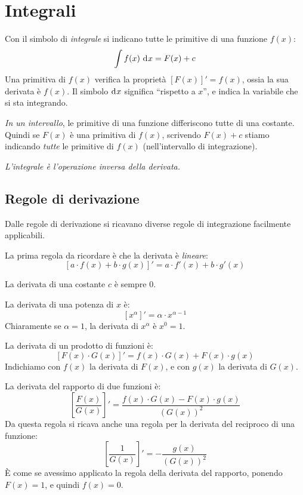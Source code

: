 
\renewcommand*\rmdefault{ppl}



\chapter{Integrali}

Con il simbolo di \emph{integrale} si indicano tutte le primitive di una funzione $f(x)$:
\[
\int f(x) \dx = F(x) + c
\]
Una primitiva di $f(x)$ verifica la propriet\`a $[F(x)]' = f(x)$, ossia
la sua derivata \`e $f(x)$.
Il simbolo $\diff x$ significa ``rispetto a $x$'', e indica la variabile 
che si sta integrando.

\emph{In un intervallo}, le primitive di una funzione differiscono tutte 
di una costante. Quindi se $F(x)$ \`e una primitiva di $f(x)$, scrivendo
$F(x) + c$ stiamo indicando \emph{tutte} le primitive di $f(x)$ 
(nell'intervallo di integrazione).

\emph{L'integrale \`e l'operazione inversa della derivata.}

\section{Regole di derivazione}

Dalle regole di derivazione si ricavano diverse regole di integrazione 
facilmente applicabili.

La prima regola da ricordare \`e che la derivata \`e \emph{lineare}:
\[
\left[ a \cdot f(x) + b \cdot g(x) \right]' =
a \cdot f'(x) + b \cdot g'(x)
\]

La derivata di una costante $c$ \`e sempre 0.

La derivata di una potenza di $x$ \`e:
\[
\left[ x^{\alpha} \right]' = \alpha \cdot x^{\alpha - 1}
\]
Chiaramente se $\alpha = 1$, la derivata di $x^{\alpha}$ \`e $x^0 = 1$.

La derivata di un prodotto di funzioni \`e:
\[
\left[ F(x) \cdot G(x) \right]' = 
f(x) \cdot G(x) + F(x) \cdot g(x)
\]
Indichiamo con $f(x)$ la derivata di $F(x)$, e con $g(x)$ la derivata 
di $G(x)$.

La derivata del rapporto di due funzioni \`e:
\[
\left[ \frac{F(x)}{G(x)} \right]' =
\frac{f(x) \cdot G(x) - F(x) \cdot g(x)}{\left(G(x)\right)^2}
\]
Da questa regola si ricava anche una regola per la derivata del
reciproco di una funzione:
\[
\left[ \frac{1}{G(x)} \right]' =
- \frac{g(x)}{\left(G(x)\right)^2}
\]
\`E come se avessimo applicato la regola della derivata del rapporto, 
ponendo $F(x) = 1$, e quindi $f(x) = 0$.

